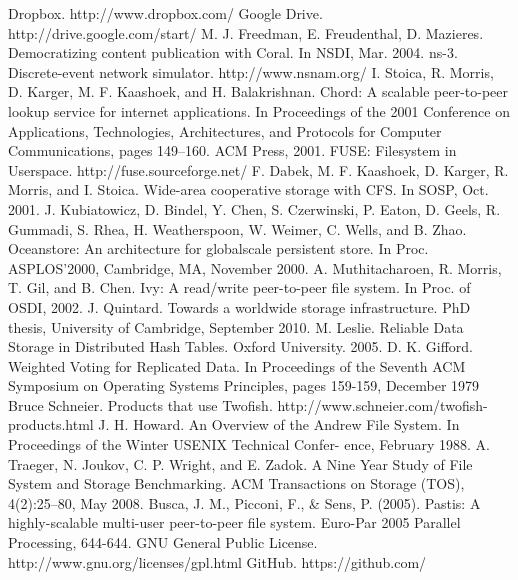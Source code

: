 \documentclass[8pt,a4paper]{article}
\begin{document}

\begin{thebibliography}{10}
Dropbox. http://www.dropbox.com/
Google Drive. http://drive.google.com/start/
M. J. Freedman, E. Freudenthal, D. Mazieres.
Democratizing content publication with Coral.
In NSDI, Mar. 2004.
ns-3. Discrete-event network simulator. http://www.nsnam.org/
I. Stoica, R. Morris, D. Karger, M. F. Kaashoek, and
H. Balakrishnan. Chord: A scalable peer-to-peer lookup
service for internet applications. In Proceedings of the 2001
Conference on Applications, Technologies, Architectures,
and Protocols for Computer Communications, pages
149–160. ACM Press, 2001.
FUSE: Filesystem in Userspace. http://fuse.sourceforge.net/ 
F. Dabek, M. F. Kaashoek, D. Karger, R. Morris, and I. Stoica. Wide-area
cooperative storage with CFS. In SOSP, Oct. 2001.
J. Kubiatowicz, D. Bindel, Y. Chen, S. Czerwinski, P. Eaton, D. Geels, R. Gummadi, S. Rhea,
H. Weatherspoon, W. Weimer, C. Wells, and B. Zhao. Oceanstore: An architecture for globalscale persistent store. In Proc. ASPLOS’2000, Cambridge, MA, November 2000.
A. Muthitacharoen, R. Morris, T. Gil, and B. Chen. 
Ivy: A read/write peer-to-peer file system. 
In Proc. of OSDI, 2002.
J. Quintard. Towards a worldwide storage infrastructure.
PhD thesis, University of Cambridge, September 2010.
M. Leslie.
Reliable Data Storage in Distributed Hash Tables. Oxford University. 2005.
D. K. Gifford. Weighted Voting for Replicated 
Data. In Proceedings of the Seventh ACM 
Symposium on Operating Systems Principles, 
pages 159-159, December 1979
Bruce Schneier. Products that use Twofish. http://www.schneier.com/twofish-products.html
J. H. Howard. An Overview of the Andrew File System.
In Proceedings of the Winter USENIX Technical Confer-
ence, February 1988.
A. Traeger, N. Joukov, C. P. Wright, and E. Zadok. A
Nine Year Study of File System and Storage Benchmarking. ACM Transactions on Storage (TOS), 4(2):25–80,
May 2008.
Busca, J. M., Picconi, F., \& Sens, P. (2005). Pastis: A highly-scalable multi-user peer-to-peer file system. Euro-Par 2005 Parallel Processing, 644-644.
GNU General Public License. http://www.gnu.org/licenses/gpl.html
GitHub. https://github.com/ 
\end{thebibliography}
\end{document}
